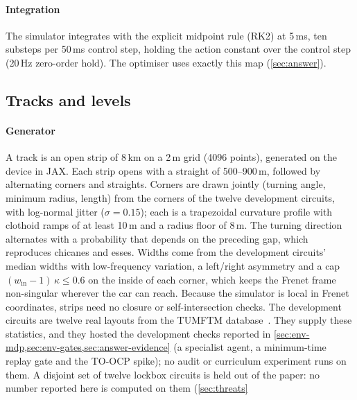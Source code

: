 \paragraph{Integration} The simulator integrates with the explicit midpoint rule (RK2)
at 5\,ms, ten substeps per 50\,ms control step, holding the action constant over the
control step (20\,Hz zero-order hold).
The optimiser uses exactly this map (\cref{sec:answer}).

\subsection{Tracks and levels}
\label{sec:env-levels}

\paragraph{Generator} A track is an open strip of 8\,km on a 2\,m grid (\num{4096}
points), generated on the device in JAX.
Each strip opens with a straight of 500--900\,m, followed by alternating corners and
straights. Corners are drawn jointly (turning angle, minimum radius, length) from the
corners of the twelve development circuits, with log-normal jitter ($\sigma = 0.15$); each
is a trapezoidal curvature profile with clothoid ramps of at least 10\,m and a radius
floor of 8\,m. The turning direction alternates with a probability that depends on the
preceding gap, which reproduces chicanes and esses. Widths come from the development
circuits' median widths with low-frequency variation, a left/right asymmetry and a cap
$(w_{\text{in}} - 1)\,\kappa \le 0.6$ on the inside of each corner, which keeps the
Frenet frame non-singular wherever the car can reach.
Because the simulator is local in Frenet coordinates, strips need no closure or
self-intersection checks. The development circuits are twelve real layouts from the
TUMFTM database~\citep{tumftm_tracks}. They supply these statistics, and they hosted the
development checks reported in \cref{sec:env-mdp,sec:env-gates,sec:answer-evidence}
(a specialist agent, a minimum-time replay gate and the TO-OCP spike); no audit or
curriculum experiment runs on them. A disjoint set of twelve lockbox circuits is held
out of the paper: no number reported here is computed on them (\cref{sec:threats}
